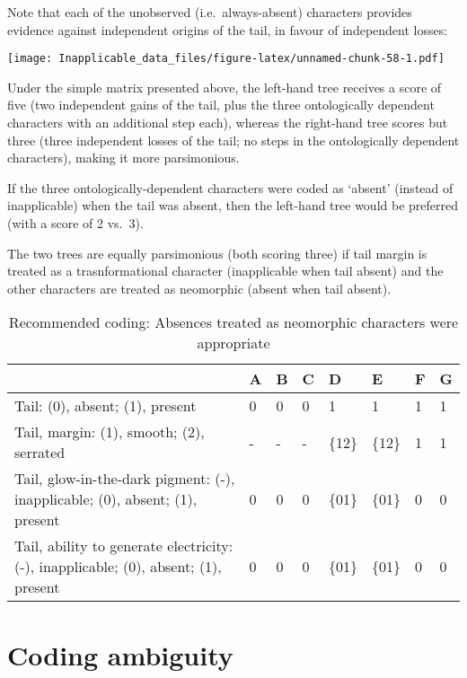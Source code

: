 \documentclass[]{book}
\theoremstyle{definition}
\theoremstyle{definition}
\theoremstyle{definition}
\theoremstyle{remark}
\begin{document}
Note that each of the unobserved (i.e.~always-absent) characters
provides evidence against independent origins of the tail, in favour of
independent losses:

\texttt{[image: Inapplicable\_data\_files/figure-latex/unnamed-chunk-58-1.pdf]}

Under the simple matrix presented above, the left-hand tree receives a
score of five (two independent gains of the tail, plus the three
ontologically dependent characters with an additional step each),
whereas the right-hand tree scores but three (three independent losses
of the tail; no steps in the ontologically dependent characters), making
it more parsimonious.

If the three ontologically-dependent characters were coded as `absent'
(instead of inapplicable) when the tail was absent, then the left-hand
tree would be preferred (with a score of 2 vs.~3).

The two trees are equally parsimonious (both scoring three) if tail
margin is treated as a trasnformational character (inapplicable when
tail absent) and the other characters are treated as neomorphic (absent
when tail absent).

\begin{table}

\caption{\label{tab:unnamed-chunk-59}Recommended coding: Absences treated as neomorphic characters were appropriate}
\centering
\begin{tabular}[t]{l|l|l|l|l|l|l|l}
\hline
  & A & B & C & D & E & F & G\\
\hline
Tail: (0), absent; (1), present & 0 & 0 & 0 & 1 & 1 & 1 & 1\\
\hline
Tail, margin: (1), smooth; (2), serrated & - & - & - & \{12\} & \{12\} & 1 & 1\\
\hline
Tail, glow-in-the-dark pigment: (-), inapplicable; (0), absent; (1), present & 0 & 0 & 0 & \{01\} & \{01\} & 0 & 0\\
\hline
Tail, ability to generate electricity: (-), inapplicable; (0), absent; (1), present & 0 & 0 & 0 & \{01\} & \{01\} & 0 & 0\\
\hline
\end{tabular}
\end{table}

\hypertarget{ambiguity}{%
\chapter{Coding ambiguity}\label{ambiguity}}
\end{document}
